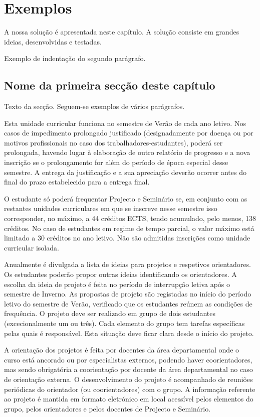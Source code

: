 \chapter{Exemplos} \label{ch:exemplos}

A nossa solução é apresentada neste capítulo. A solução consiste em grandes ideias, desenvolvidas e testadas.

Exemplo de indentação do segundo parágrafo.


\section{Nome da primeira secção deste capítulo} \label{sec31}
Texto da secção. Seguem-se exemplos de vários parágrafos.

Esta unidade curricular funciona no semestre de Verão de cada ano letivo. Nos casos de impedimento prolongado justificado (designadamente por doença ou por motivos profissionais no caso dos trabalhadores-estudantes), poderá ser prolongada, havendo lugar à elaboração de outro relatório de progresso
e a nova inscrição se o prolongamento for além do período de época especial desse semestre. A entrega da justificação e a sua apreciação deverão ocorrer antes do final do prazo estabelecido para a entrega final.

O estudante só poderá frequentar Projecto e Seminário se, em conjunto com as restantes unidades curriculares em que se inscreve nesse semestre isso corresponder, no máximo, a 44 créditos ECTS, tendo acumulado, pelo menos, 138 créditos. No caso de estudantes em regime de tempo parcial, o valor máximo
está limitado a 30 créditos no ano letivo. Não são admitidas inscrições como unidade curricular isolada.

Anualmente é divulgada a lista de ideias para projetos e respetivos orientadores. Os estudantes poderão propor outras ideias identificando os orientadores. A escolha da ideia de projeto é feita no período de
interrupção letiva após o semestre de Inverno. As propostas de projeto são registadas no início do período letivo do semestre de Verão, verificado que os estudantes reúnem as condições de frequência.
O projeto deve ser realizado em grupo de dois estudantes (excecionalmente um ou três). Cada elemento do grupo tem tarefas específicas pelas quais é responsável. Esta situação deve ficar clara desde o início do projeto.

A orientação dos projetos é feita por docentes da área departamental onde o curso está ancorado ou por especialistas externos, podendo haver coorientadores, mas sendo obrigatória a coorientação por docente da área departamental no caso de orientação externa. O desenvolvimento do projeto é acompanhado de reuniões periódicas do orientador (ou coorientadores) com o grupo. A informação referente ao projeto é mantida em formato eletrónico em local acessível pelos elementos do grupo, pelos orientadores e pelos docentes de Projecto e Seminário.\\

